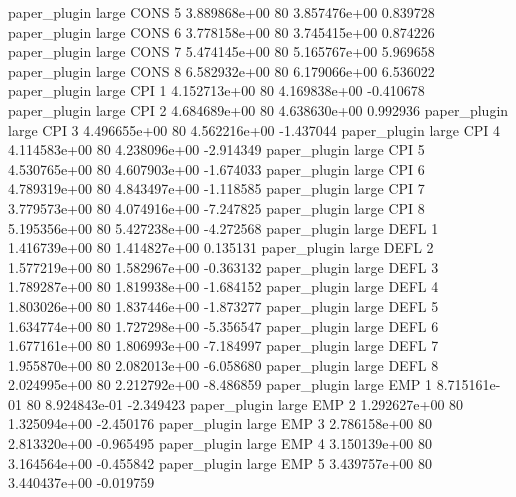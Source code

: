        paper_plugin      large     CONS                 5 3.889868e+00 80   3.857476e+00           0.839728
       paper_plugin      large     CONS                 6 3.778158e+00 80   3.745415e+00           0.874226
       paper_plugin      large     CONS                 7 5.474145e+00 80   5.165767e+00           5.969658
       paper_plugin      large     CONS                 8 6.582932e+00 80   6.179066e+00           6.536022
       paper_plugin      large      CPI                 1 4.152713e+00 80   4.169838e+00          -0.410678
       paper_plugin      large      CPI                 2 4.684689e+00 80   4.638630e+00           0.992936
       paper_plugin      large      CPI                 3 4.496655e+00 80   4.562216e+00          -1.437044
       paper_plugin      large      CPI                 4 4.114583e+00 80   4.238096e+00          -2.914349
       paper_plugin      large      CPI                 5 4.530765e+00 80   4.607903e+00          -1.674033
       paper_plugin      large      CPI                 6 4.789319e+00 80   4.843497e+00          -1.118585
       paper_plugin      large      CPI                 7 3.779573e+00 80   4.074916e+00          -7.247825
       paper_plugin      large      CPI                 8 5.195356e+00 80   5.427238e+00          -4.272568
       paper_plugin      large     DEFL                 1 1.416739e+00 80   1.414827e+00           0.135131
       paper_plugin      large     DEFL                 2 1.577219e+00 80   1.582967e+00          -0.363132
       paper_plugin      large     DEFL                 3 1.789287e+00 80   1.819938e+00          -1.684152
       paper_plugin      large     DEFL                 4 1.803026e+00 80   1.837446e+00          -1.873277
       paper_plugin      large     DEFL                 5 1.634774e+00 80   1.727298e+00          -5.356547
       paper_plugin      large     DEFL                 6 1.677161e+00 80   1.806993e+00          -7.184997
       paper_plugin      large     DEFL                 7 1.955870e+00 80   2.082013e+00          -6.058680
       paper_plugin      large     DEFL                 8 2.024995e+00 80   2.212792e+00          -8.486859
       paper_plugin      large      EMP                 1 8.715161e-01 80   8.924843e-01          -2.349423
       paper_plugin      large      EMP                 2 1.292627e+00 80   1.325094e+00          -2.450176
       paper_plugin      large      EMP                 3 2.786158e+00 80   2.813320e+00          -0.965495
       paper_plugin      large      EMP                 4 3.150139e+00 80   3.164564e+00          -0.455842
       paper_plugin      large      EMP                 5 3.439757e+00 80   3.440437e+00          -0.019759
